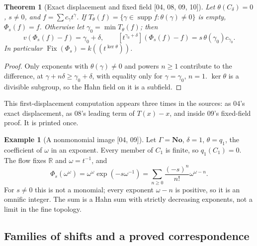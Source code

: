 \documentclass[11pt,oneside]{article}
\numberwithin{equation}{section}
\newtheorem{theorem}{Theorem}[section]
\theoremstyle{definition}
\newtheorem{example}[example]{Example}
\theoremstyle{remark}
\newcommand{\No}{\mathbf{No}}
\newcommand{\R}{\mathbb R}
\newcommand{\supp}{\operatorname{supp}}
\newcommand{\Fix}{\operatorname{Fix}}
\newcommand{\Hahn}[2]{#1((t^{#2}))}
\newcommand{\coef}[2]{[t^{#1}]#2}
\newcommand{\src}[1]{\textup{\textsf{\small[#1]}}}
\begin{document}
\begin{theorem}[Exact displacement and fixed field \src{04, 08, 09, 10}]\label{opa:thm:fixedshear}
Let $\theta(C_\delta)=0$, $s\ne0$, and $f=\sum c_\gamma t^\gamma$. If
$T_\theta(f)=\{\gamma\in\supp f:\theta(\gamma)\ne0\}$ is empty, $\Phi_s(f)=f$.
Otherwise let $\gamma_0=\min T_\theta(f)$; then
\[
 v(\Phi_s(f)-f)=\gamma_0+\delta,\qquad
 \coef{\gamma_0+\delta}{(\Phi_s(f)-f)}=s\,\theta(\gamma_0)c_{\gamma_0}.
\]
In particular $\Fix(\Phi_s)=\Hahn k{\ker\theta}$.
\end{theorem}
\begin{proof}
Only exponents with $\theta(\gamma)\ne0$ and powers $n\ge1$ contribute to the
difference, at $\gamma+n\delta\ge\gamma_0+\delta$, with equality only for
$\gamma=\gamma_0$, $n=1$. $\ker\theta$ is a divisible subgroup, so the Hahn
field on it is a subfield.
\end{proof}

This first-displacement computation appears three times in the sources: as
04's exact displacement, as 08's leading term of $T(x)-x$, and inside 09's
fixed-field proof. It is printed once.

\begin{example}[A nonmonomial image \src{04, 09}]\label{opa:ex:omegaomega}
Let $\Gamma=\No$, $\delta=1$, $\theta=q_1$, the coefficient of $\omega$ in an
exponent. Every member of $C_1$ is finite, so $q_1(C_1)=0$. The flow fixes
$\R$ and $\omega=t^{-1}$, and
\[
 \Phi_s(\omega^\omega)=\omega^\omega\exp(-s\omega^{-1})
 =\sum_{n\ge0}\frac{(-s)^n}{n!}\omega^{\omega-n}.
\]
For $s\ne0$ this is not a monomial; every exponent $\omega-n$ is positive, so it
is an omnific integer. The sum is a Hahn sum with strictly decreasing
exponents, not a limit in the fine topology.
\end{example}

\subsection{Families of shifts and a proved correspondence}
\end{document}
